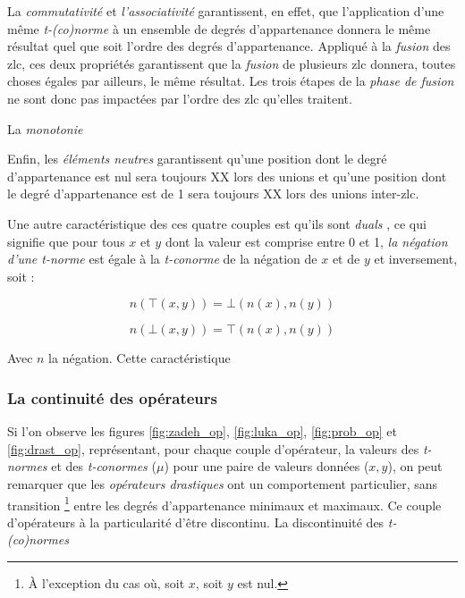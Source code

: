 La \emph{commutativité} et \emph{l'associativité} garantissent, en
effet, que l’application d'une même \emph{t-(co)norme} à un ensemble
de degrés d'appartenance donnera le même résultat quel que soit
l'ordre des degrés d’appartenance. Appliqué à la \emph{fusion} des
\ac{zlc}, ces deux propriétés garantissent que la \emph{fusion} de
plusieurs \ac{zlc} donnera, toutes choses égales par ailleurs, le même
résultat. Les trois étapes de la \emph{phase de fusion} ne sont donc
pas impactées par l'ordre des \ac{zlc} qu'elles traitent.

La \emph{monotonie}


Enfin, les \emph{éléments neutres} garantissent qu'une position dont
le degré d'appartenance est nul sera toujours XX lors des unions et
qu'une position dont le degré d’appartenance est de 1 sera toujours XX
lors des unions inter-\ac{zlc}.


Une autre caractéristique des ces quatre couples est qu'ils sont
\emph{duals} \autocite{Bouchon-Meunier2007}, ce qui signifie que pour
tous \(x\) et \(y\) dont la valeur est comprise entre 0 et 1, \emph{la
  négation d'une \emph{t-norme}} est égale à la \emph{t-conorme} de la
négation de \(x\) et de \(y\) et inversement, soit :

\begin{equation}
  n\left(⊤(x,y)\right) = ⊥\left(n(x), n(y)\right)
\end{equation}

\begin{equation}
  n\left(⊥(x,y)\right) = ⊤\left(n(x), n(y)\right)
\end{equation}

Avec \(n\) la négation. Cette caractéristique




\subsubsection{La continuité des opérateurs}

Si l'on observe les figures \ref{fig:zadeh_op}, \ref{fig:luka_op},
\ref{fig:prob_op} et \ref{fig:drast_op}, représentant, pour chaque
couple d'opérateur, la valeurs des \emph{t-normes} et des
\emph{t-conormes} (\(\mu\)) pour une paire de valeurs données
(\(x,y\)), on peut remarquer que les \emph{opérateurs drastiques} ont
un comportement particulier, sans transition \footnote{À l'exception
  du cas où, soit \(x\), soit \(y\) est nul.} entre les degrés
d’appartenance minimaux et maximaux. Ce couple d'opérateurs à la
particularité d'être discontinu. La discontinuité des
\emph{t-(co)normes}


